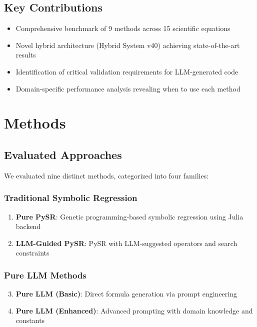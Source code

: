 \documentclass[11pt,a4paper]{article}
\begin{document}
\subsection{Key Contributions}

\begin{itemize}
    \item Comprehensive benchmark of 9 methods across 15 scientific equations
    \item Novel hybrid architecture (Hybrid System v40) achieving state-of-the-art results
    \item Identification of critical validation requirements for LLM-generated code
    \item Domain-specific performance analysis revealing when to use each method
\end{itemize}

\section{Methods}

\subsection{Evaluated Approaches}

We evaluated nine distinct methods, categorized into four families:

\subsubsection{Traditional Symbolic Regression}

\begin{enumerate}
    \item \textbf{Pure PySR}: Genetic programming-based symbolic regression using Julia backend
    \item \textbf{LLM-Guided PySR}: PySR with LLM-suggested operators and search constraints
\end{enumerate}

\subsubsection{Pure LLM Methods}

\begin{enumerate}
    \setcounter{enumi}{2}
    \item \textbf{Pure LLM (Basic)}: Direct formula generation via prompt engineering
    \item \textbf{Pure LLM (Enhanced)}: Advanced prompting with domain knowledge and constants
\end{enumerate}
\end{document}
